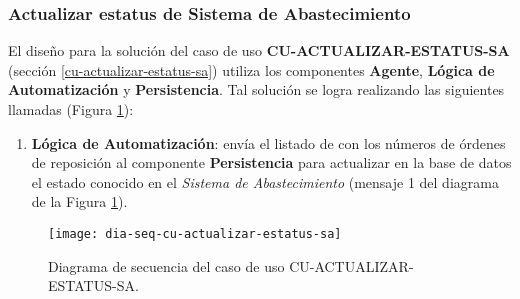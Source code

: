 \subsubsection{Actualizar estatus de Sistema de Abastecimiento}
El diseño para la solución del caso de uso \textbf{CU-ACTUALIZAR-ESTATUS-SA} (sección \ref{cu-actualizar-estatus-sa}) utiliza los componentes \textbf{Agente}, \textbf{Lógica de Automatización} y \textbf{Persistencia}. Tal solución se logra realizando las siguientes llamadas (Figura \ref{fig:dia-seq-cu-actualizar-estatus-sa}):
\begin{enumerate}
	\item \textbf{Lógica de Automatización}: envía el listado de con los números de órdenes de reposición al componente \textbf{Persistencia} para actualizar en la base de datos el estado conocido en el \textit{Sistema de Abastecimiento} (mensaje 1 del diagrama de la Figura \ref{fig:dia-seq-cu-actualizar-estatus-sa}).
\end{enumerate}
\begin{figure}[h]
	\centering
	\texttt{[image: dia-seq-cu-actualizar-estatus-sa]}
	\caption{Diagrama de secuencia del caso de uso CU-ACTUALIZAR-ESTATUS-SA.}
	\label{fig:dia-seq-cu-actualizar-estatus-sa}
\end{figure}
